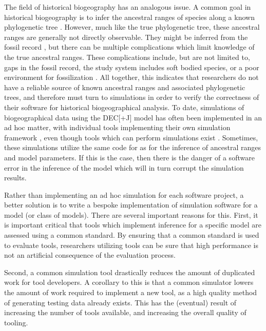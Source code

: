 \documentclass{article}
\begin{document}
The field of historical biogeography has an analogous issue.
A common goal in historical biogeography is to infer the ancestral ranges of species along a known phylogenetic tree
\citep{varela_phylogeny_2019, baker_global_2013, vicente_and_2017}.
However, much like the true phylogenetic tree, these ancestral ranges are generally not directly observable.
They might be inferred from the fossil record \cite{mclachlan_reconstructing_2004}, but there can be multiple
complications which limit knowledge of the true ancestral ranges.
These complications include, but are not limited to, gaps in the fossil record, the study system includes soft bodied
species, or a poor environment for fossilization \cite{kidwell_quality_2002}.
All together, this indicates that researchers do not have a reliable source of known ancestral ranges and associated
phylogenetic trees, and therefore must turn to simulations in order to verify the correctness of their software for
historical biogeographical analysis.
To date, simulations of biogeographical data using the DEC[+J] model has often been implemented in an ad hoc matter,
with individual tools implementing their own simulation framework \cite{matzke_statistical_2022,
bettisworth_lagrange-ng_2023}, even though tools which can perform simulations exist \cite{hohna_revbayes_2016}.
Sometimes, these simulations utilize the same code for as for the inference of ancestral ranges and model parameters.
If this is the case, then there is the danger of a software error in the inference of the model which will in turn
corrupt the simulation results.

Rather than implementing an ad hoc simulation for each software project, a better solution is to write a bespoke
implementation of simulation software for a model (or class of models).
There are several important reasons for this.
First, it is important critical that tools which implement inference for a specific model are assessed using a common
standard.
By ensuring that a common standard is used to evaluate tools, researchers utilizing tools can be sure that high
performance is not an artificial consequence of the evaluation process.

Second, a common simulation tool drastically reduces the amount of duplicated work for tool developers.
A corollary to this is that a common simulator lowers the amount of work required to implement a new tool, as a high
quality method of generating testing data already exists.
This has the (eventual) result of increasing the number of tools available, and increasing the overall quality of
tooling.
\end{document}

